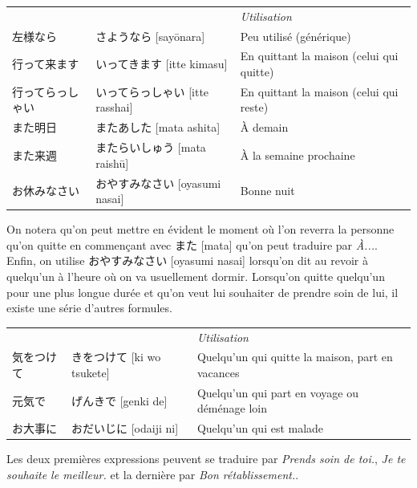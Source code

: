 \documentclass[a4paper,11pt,final]{article}
\newcommand{\romaji}[1]{{\footnotesize[#1]}}
\begin{document}
\hspace{5mm}\begin{tabular}{|p{3.25cm}p{5cm}l}
    \multicolumn{1}{l}{}&& \it\small Utilisation \\
    左様なら              & さようなら \romaji{say\=onara}            & Peu
    utilisé (générique) \\
    行って来ます        & いってきます \romaji{itte kimasu}        & En
    quittant la maison (celui qui quitte) \\
    行ってらっしゃい  & いってらっしゃい \romaji{itte rasshai} & En quittant la
    maison (celui qui reste) \\
    また明日              & またあした \romaji{mata ashita}           & À
    demain \\
    また来週              & またらいしゅう \romaji{mata raish\=u}   & À la
    semaine prochaine \\
    お休みなさい        & おやすみなさい \romaji{oyasumi nasai}   & Bonne nuit
\end{tabular}

On notera qu'on peut mettre en évident le moment où l'on reverra la personne
qu'on quitte en commençant avec また \romaji{mata} qu'on peut traduire par
\og\textit{À...}\fg. Enfin, on utilise おやすみなさい \romaji{oyasumi nasai}
lorsqu'on dit au revoir à quelqu'un à l'heure où on va usuellement dormir.
Lorsqu'on quitte quelqu'un pour une plus longue durée et qu'on veut lui
souhaiter de prendre soin de lui, il existe une série d'autres formules.

\hspace{5mm}\begin{tabular}{|p{2.5cm}p{5cm}l}
    \multicolumn{1}{l}{}&& \it\small Utilisation \\
    気をつけて  & きをつけて \romaji{ki wo tsukete}    & Quelqu'un qui quitte
    la maison, part en vacances  \\
    元気で        & げんきで \romaji{genki de}            & Quelqu'un qui part
    en voyage ou déménage loin \\
    お大事に     & おだいじに \romaji{odaiji ni}        & Quelqu'un qui est
    malade
\end{tabular}

Les deux premières expressions peuvent se traduire par \og\textit{Prends soin
de toi.}\fg{}, \og\textit{Je te souhaite le meilleur.}\fg{} et la dernière par
\og\textit{Bon rétablissement.}\fg{}.

\end{document}
